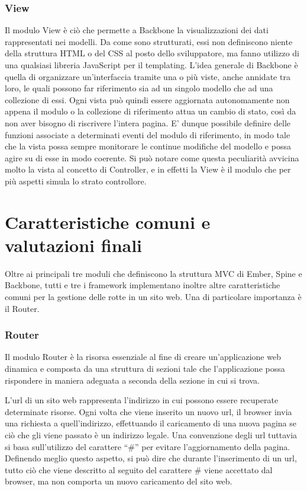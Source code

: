 \subsubsection{View} %
\label{ssub:backbone_view}
Il modulo View è ciò che permette a Backbone la visualizzazioni dei dati rappresentati nei modelli. Da come sono strutturati, essi non definiscono niente della struttura HTML o del CSS al posto dello sviluppatore, ma fanno utilizzo di una qualsiasi libreria JavaScript per il  templating. L'idea generale di Backbone è quella di organizzare un'interfaccia tramite una o più viste, anche annidate tra loro, le quali possono far riferimento sia ad un singolo modello che ad una collezione di essi. Ogni vista può quindi essere aggiornata autonomamente non appena il modulo o la collezione di riferimento attua un cambio di stato, così da non aver bisogno di riscrivere l'intera pagina.
E' dunque possibile definire delle funzioni associate a determinati eventi del modulo di riferimento, in modo tale che la vista possa sempre monitorare le continue modifiche del modello e possa agire su di esse in modo coerente. Si può notare come questa peculiarità avvicina molto la vista al concetto di Controller, e in effetti la View è il modulo che per più aspetti simula lo strato controllore.

\newpage


\section{Caratteristiche comuni e valutazioni finali} %
\label{sec:caratteristiche_comuni_e_valutazioni_finali}

Oltre ai principali tre moduli che definiscono la struttura MVC di Ember, Spine e Backbone, tutti e tre i framework implementano inoltre altre caratteristiche comuni per la gestione delle rotte in un sito web. Una di particolare importanza è il Router.

\subsubsection{Router} %
\label{ssub:router}
Il modulo Router è la risorsa essenziale al fine di creare un'applicazione web dinamica e composta da una struttura di sezioni tale che l'applicazione possa rispondere in maniera adeguata a seconda della sezione in cui si trova.

L'url di un sito web rappresenta l'indirizzo in cui possono essere recuperate determinate risorse. Ogni volta che viene inserito un nuovo url, il browser invia una richiesta a quell'indirizzo, effettuando il caricamento di una nuova pagina se ciò che gli viene passato è un indirizzo legale.
Una convenzione degli url tuttavia si basa sull'utilizzo del carattere ``\#'' per evitare l'aggiornamento della pagina. Definendo meglio questo aspetto, si può dire che durante l'inserimento di un url, tutto ciò che viene descritto al seguito del carattere \# viene accettato dal browser, ma non comporta un nuovo caricamento del sito web.

